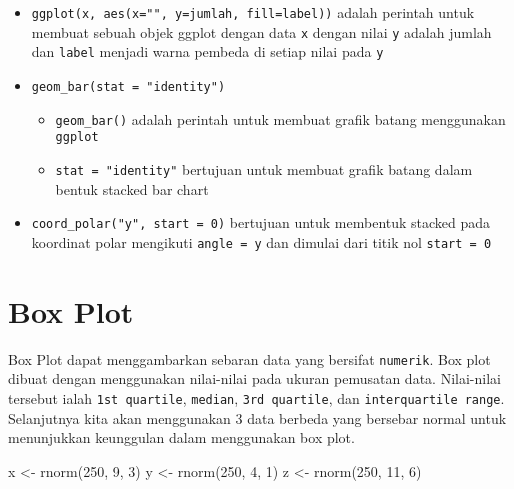 \documentclass[
]{book}
\newenvironment{Shaded}{\begin{snugshade}}{\end{snugshade}}
\newcommand{\DecValTok}[1]{\textcolor[rgb]{0.00,0.00,0.81}{#1}}
\newcommand{\FunctionTok}[1]{\textcolor[rgb]{0.00,0.00,0.00}{#1}}
\newcommand{\NormalTok}[1]{#1}
\newcommand{\OtherTok}[1]{\textcolor[rgb]{0.56,0.35,0.01}{#1}}
\providecommand{\tightlist}{%
  \setlength{\itemsep}{0pt}\setlength{\parskip}{0pt}}
\begin{document}
\begin{itemize}
\tightlist
\item
  \texttt{ggplot(x,\ aes(x="",\ y=jumlah,\ fill=label))} adalah perintah untuk membuat sebuah objek ggplot dengan data \texttt{x} dengan nilai \texttt{y} adalah jumlah dan \texttt{label} menjadi warna pembeda di setiap nilai pada \texttt{y}
\item
  \texttt{geom\_bar(stat\ =\ "identity")}

  \begin{itemize}
  \tightlist
  \item
    \texttt{geom\_bar()} adalah perintah untuk membuat grafik batang menggunakan \texttt{ggplot}
  \item
    \texttt{stat\ =\ "identity"} bertujuan untuk membuat grafik batang dalam bentuk stacked bar chart
  \end{itemize}
\item
  \texttt{coord\_polar("y",\ start\ =\ 0)} bertujuan untuk membentuk stacked pada koordinat polar mengikuti \texttt{angle\ =\ y} dan dimulai dari titik nol \texttt{start\ =\ 0}
\end{itemize}

\hypertarget{box-plot}{%
\section{Box Plot}\label{box-plot}}

Box Plot dapat menggambarkan sebaran data yang bersifat \texttt{numerik}. Box plot dibuat dengan menggunakan nilai-nilai pada ukuran pemusatan data. Nilai-nilai tersebut ialah \texttt{1st\ quartile}, \texttt{median}, \texttt{3rd\ quartile}, dan \texttt{interquartile\ range}. Selanjutnya kita akan menggunakan 3 data berbeda yang bersebar normal untuk menunjukkan keunggulan dalam menggunakan box plot.

\begin{Shaded}
\begin{Highlighting}[]
\NormalTok{x }\OtherTok{\textless{}{-}} \FunctionTok{rnorm}\NormalTok{(}\DecValTok{250}\NormalTok{, }\DecValTok{9}\NormalTok{, }\DecValTok{3}\NormalTok{)}
\NormalTok{y }\OtherTok{\textless{}{-}} \FunctionTok{rnorm}\NormalTok{(}\DecValTok{250}\NormalTok{, }\DecValTok{4}\NormalTok{, }\DecValTok{1}\NormalTok{)}
\NormalTok{z }\OtherTok{\textless{}{-}} \FunctionTok{rnorm}\NormalTok{(}\DecValTok{250}\NormalTok{, }\DecValTok{11}\NormalTok{, }\DecValTok{6}\NormalTok{)}
\end{Highlighting}
\end{Shaded}
\end{document}
